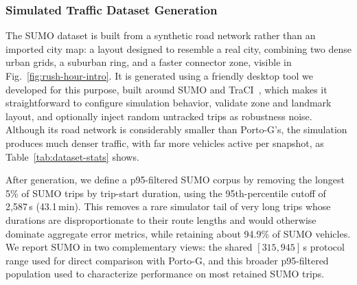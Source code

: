 \subsubsection{Simulated Traffic Dataset Generation}
The SUMO dataset is built from a synthetic road network rather than an imported city map: a layout designed to resemble a real city, combining two dense urban grids, a suburban ring, and a faster connector zone, visible in Fig.~\ref{fig:rush-hour-intro}. It is generated using a friendly desktop tool we developed for this purpose, built around SUMO and TraCI~\cite{SUMO2018,sumo_data_generator}, which makes it straightforward to configure simulation behavior, validate zone and landmark layout, and optionally inject random untracked trips as robustness noise. Although its road network is considerably smaller than Porto-G's, the simulation produces much denser traffic, with far more vehicles active per snapshot, as Table~\ref{tab:dataset-stats} shows.

After generation, we define a p95-filtered SUMO corpus by removing the longest 5\% of SUMO trips by trip-start duration, using the 95th-percentile cutoff of 2{,}587\,s (43.1\,min). This removes a rare simulator tail of very long trips whose durations are disproportionate to their route lengths and would otherwise dominate aggregate error metrics, while retaining about 94.9\% of SUMO vehicles. We report SUMO in two complementary views: the shared $[315,945]$\,s protocol range used for direct comparison with Porto-G, and this broader p95-filtered population used to characterize performance on most retained SUMO trips.

